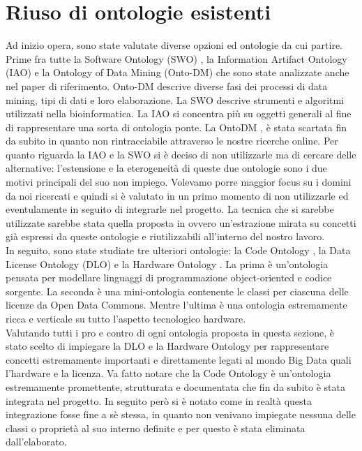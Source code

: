 \section{Riuso di ontologie esistenti}
Ad inizio opera, sono state valutate diverse opzioni ed ontologie da cui partire. \\

Prime fra tutte la Software Ontology (SWO) \cite{SWO}, la Information Artifact Ontology (IAO) \cite{IAO} e la Ontology of Data Mining (Onto-DM) \cite{OntoDM} che sono state analizzate anche nel paper di riferimento. Onto-DM descrive diverse fasi dei processi di data mining, tipi di dati e loro elaborazione. La SWO descrive strumenti e algoritmi utilizzati nella bioinformatica. La IAO si concentra più su oggetti generali al fine di rappresentare una sorta di ontologia ponte. La OntoDM \cite{OntoDM}, è stata scartata fin da subito in quanto non rintracciabile attraverso le nostre ricerche online. Per quanto riguarda la IAO \cite{IAO} e la SWO \cite{SWO} si è deciso di non utilizzarle ma di cercare delle alternative: l'estensione e la eterogeneità di queste due ontologie sono i due motivi principali del suo non impiego. Volevamo porre maggior focus su i domini da noi ricercati e quindi si è valutato in un primo momento di non utilizzarle ed eventulamente in seguito di integrarle nel progetto. La tecnica che si sarebbe utilizzate sarebbe stata quella proposta in \cite{BDOnto} ovvero un'estrazione mirata su concetti già espressi da queste ontologie e riutilizzabili all'interno del nostro lavoro.\\

In seguito, sono state studiate tre ulteriori ontologie: la Code Ontology \cite{Code_Ontology}, la Data License Ontology (DLO) \cite{DLO} e la Hardware Ontology \cite{Hardware_Ontology}. La prima è un'ontologia pensata per modellare linguaggi di programmazione object-oriented e codice sorgente. La seconda è una mini-ontologia contenente le classi per ciascuna delle licenze da Open Data Commons. Mentre l'ultima è una ontologia estremamente ricca e verticale su tutto l'aspetto tecnologico hardware.\\

Valutando tutti i pro e contro di ogni ontologia proposta in questa sezione, è stato scelto di impiegare la DLO \cite{DLO} e la Hardware Ontology \cite{Hardware_Ontology} per rappresentare concetti estremamente importanti e direttamente legati al mondo Big Data quali l'hardware e la licenza. Va fatto notare che la Code Ontology \cite{Code_Ontology} è un'ontologia estremamente promettente, strutturata e documentata che fin da subito è stata integrata nel progetto. In seguito però si è notato come in realtà questa integrazione fosse fine a sè stessa, in quanto non venivano impiegate nessuna delle classi o proprietà al suo interno definite e per questo è stata eliminata dall'elaborato.
 
